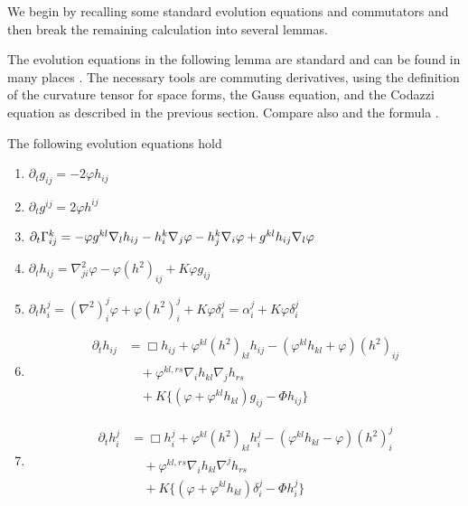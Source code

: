 \documentclass{amsart}
\begin{document}
We begin by recalling some standard evolution equations and commutators and then break the remaining calculation into several lemmas.

The evolution equations in the following lemma are standard and can be found in many places \cite{MR1296393,MR1100812, MR1316556, MR892052, MR1480081}. The necessary tools are commuting derivatives, using the definition of the curvature tensor for space forms, the Gauss equation, and the Codazzi equation as described in the previous section. Compare also \cite[p.~94-95]{Gerhardt:/2006} and the formula \cite[eq.~(6.17)]{Gerhardt:01/1996}.

\begin{lemma}
\label{lem:evolution}
The following evolution equations hold
\begin{enumerate}
\item \label{eq:delt_metric} $\partial_tg_{ij} = -2\varphi h_{ij}$
\item \label{eq:delt_inversemetric} $\partial_t g^{ij} = 2\varphi h^{ij}$
\item \label{eq:delt_christoffel} $\partial_t {\Gamma}^{k}_{ij} = -\varphi g^{kl} \nabla_l h_{ij} - h^k_i \nabla_j \varphi - h^k_j \nabla_i \varphi + g^{kl} h_{ij} \nabla_l \varphi$
\item \label{eq:delt_sff} $\partial_t h_{ij} = \nabla^2_{ji} \varphi - \varphi(h^2)_{ij} + K \varphi g_{ij}$
\item \label{eq:delt_weingarten} $\partial_t h_i^j = (\nabla^2)^j_i\varphi + \varphi(h^2)_i^j + K \varphi\delta_i^j = \alpha^j_i + K \varphi\delta_i^j$
\item \label{eq:delt_sff_box} \begin{align*}
\partial_t h_{ij} &= \Box h_{ij} + \varphi^{kl} (h^2)_{kl} h_{ij} - (\varphi^{kl}h_{kl} + \varphi) (h^2)_{ij} \\
& \quad + \varphi^{kl,rs}\nabla_i h_{kl}\nabla_j h_{rs} \\
& \quad + K \{(\varphi + \varphi^{kl}h_{kl}) g_{ij} - \Phi h_{ij}\}
\end{align*}
\item \label{eq:delt_weingarten_box} \begin{align*}
\partial_t h_i^j &= \Box h_i^j + \varphi^{kl} (h^2)_{kl} h_i^j - (\varphi^{kl}h_{kl} - \varphi) (h^2)_i^j \\
& \quad + \varphi^{kl,rs}\nabla_i h_{kl}\nabla^j h_{rs} \\
& \quad + K \{(\varphi + \varphi^{kl}h_{kl}) \delta_i^j - \Phi h_i^j\}
\end{align*}

\end{enumerate}
\end{lemma}
\end{document}
